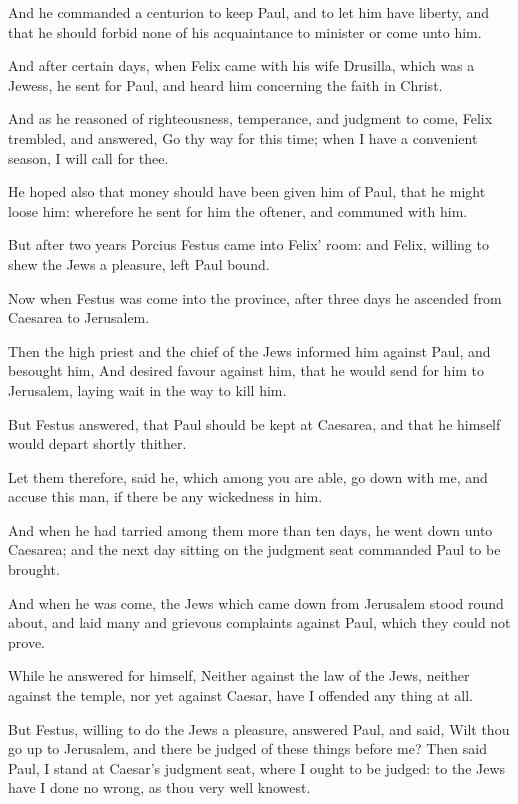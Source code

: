 \Verse And he commanded a centurion to keep Paul, and to let him have liberty, and that he should forbid none of his acquaintance to minister or come unto him.

\Verse And after certain days, when Felix came with his wife Drusilla, which was a Jewess, he sent for Paul, and heard him concerning the faith in Christ.

\Verse And as he reasoned of righteousness, temperance, and judgment to come, Felix trembled, and answered, Go thy way for this time; when I have a convenient season, I will call for thee.

\Verse He hoped also that money should have been given him of Paul, that he might loose him: wherefore he sent for him the oftener, and communed with him.

\Verse But after two years Porcius Festus came into Felix' room: and Felix, willing to shew the Jews a pleasure, left Paul bound.


\Chapter
\Verse Now when Festus was come into the province, after three days he ascended from Caesarea to Jerusalem.

\Verse Then the high priest and the chief of the Jews informed him against Paul, and besought him, \Verse And desired favour against him, that he would send for him to Jerusalem, laying wait in the way to kill him.

\Verse But Festus answered, that Paul should be kept at Caesarea, and that he himself would depart shortly thither.

\Verse Let them therefore, said he, which among you are able, go down with me, and accuse this man, if there be any wickedness in him.

\Verse And when he had tarried among them more than ten days, he went down unto Caesarea; and the next day sitting on the judgment seat commanded Paul to be brought.

\Verse And when he was come, the Jews which came down from Jerusalem stood round about, and laid many and grievous complaints against Paul, which they could not prove.

\Verse While he answered for himself, Neither against the law of the Jews, neither against the temple, nor yet against Caesar, have I offended any thing at all.

\Verse But Festus, willing to do the Jews a pleasure, answered Paul, and said, Wilt thou go up to Jerusalem, and there be judged of these things before me?  \Verse Then said Paul, I stand at Caesar's judgment seat, where I ought to be judged: to the Jews have I done no wrong, as thou very well knowest.

